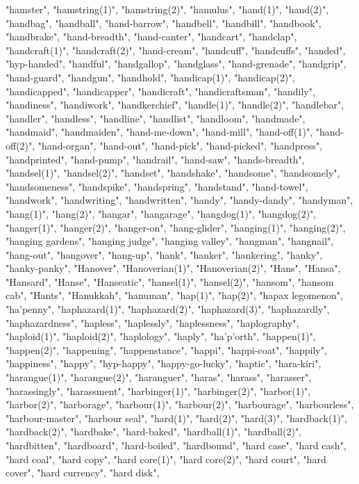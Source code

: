 "hamster",
"hamstring(1)",
"hamstring(2)",
"hamulus",
"hand(1)",
"hand(2)",
"handbag",
"handball",
"hand-barrow",
"handbell",
"handbill",
"handbook",
"handbrake",
"hand-breadth",
"hand-canter",
"handcart",
"handclap",
"handcraft(1)",
"handcraft(2)",
"hand-cream",
"handcuff",
"handcuffs",
"handed",
"hyp-handed",
"handful",
"handgallop",
"handglass",
"hand-grenade",
"handgrip",
"hand-guard",
"handgun",
"handhold",
"handicap(1)",
"handicap(2)",
"handicapped",
"handicapper",
"handicraft",
"handicraftsman",
"handily",
"handiness",
"handiwork",
"handkerchief",
"handle(1)",
"handle(2)",
"handlebar",
"handler",
"handless",
"handline",
"handlist",
"handloom",
"handmade",
"handmaid",
"handmaiden",
"hand-me-down",
"hand-mill",
"hand-off(1)",
"hand-off(2)",
"hand-organ",
"hand-out",
"hand-pick",
"hand-picked",
"handpress",
"handprinted",
"hand-pump",
"handrail",
"hand-saw",
"hands-breadth",
"handsel(1)",
"handsel(2)",
"handset",
"handshake",
"handsome",
"handsomely",
"handsomeness",
"handspike",
"handspring",
"handstand",
"hand-towel",
"handwork",
"handwriting",
"handwritten",
"handy",
"handy-dandy",
"handyman",
"hang(1)",
"hang(2)",
"hangar",
"hangarage",
"hangdog(1)",
"hangdog(2)",
"hanger(1)",
"hanger(2)",
"hanger-on",
"hang-glider",
"hanging(1)",
"hanging(2)",
"hanging gardens",
"hanging judge",
"hanging valley",
"hangman",
"hangnail",
"hang-out",
"hangover",
"hang-up",
"hank",
"hanker",
"hankering",
"hanky",
"hanky-panky",
"Hanover",
"Hanoverian(1)",
"Hanoverian(2)",
"Hans",
"Hansa",
"Hansard",
"Hanse",
"Hanseatic",
"hansel(1)",
"hansel(2)",
"hansom",
"hansom cab",
"Hants",
"Hanukkah",
"hanuman",
"hap(1)",
"hap(2)",
"hapax legomenon",
"ha'penny",
"haphazard(1)",
"haphazard(2)",
"haphazard(3)",
"haphazardly",
"haphazardness",
"hapless",
"haplessly",
"haplessness",
"haplography",
"haploid(1)",
"haploid(2)",
"haplology",
"haply",
"ha'p'orth",
"happen(1)",
"happen(2)",
"happening",
"happenstance",
"happi",
"happi-coat",
"happily",
"happiness",
"happy",
"hyp-happy",
"happy-go-lucky",
"haptic",
"hara-kiri",
"harangue(1)",
"harangue(2)",
"haranguer",
"haras",
"harass",
"harasser",
"harassingly",
"harassment",
"harbinger(1)",
"harbinger(2)",
"harbor(1)",
"harbor(2)",
"harborage",
"harbour(1)",
"harbour(2)",
"harbourage",
"harbourless",
"harbour-master",
"harbour seal",
"hard(1)",
"hard(2)",
"hard(3)",
"hardback(1)",
"hardback(2)",
"hardbake",
"hard-baked",
"hardball(1)",
"hardball(2)",
"hardbitten",
"hardboard",
"hard-boiled",
"hardbound",
"hard case",
"hard cash",
"hard coal",
"hard copy",
"hard core(1)",
"hard core(2)",
"hard court",
"hard cover",
"hard currency",
"hard disk",
